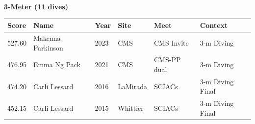 \noindent\begin{minipage}[t]{0.98\textwidth}
\centering
\textbf{\textcolor{teamprimary}{3-Meter (11 dives)}}\par
\vspace{0.5em}
\centering
\small
\renewcommand{\arraystretch}{1.0}
\setlength{\tabcolsep}{4pt}
\begin{tabular}{@{}p{2.0cm}p{3.2cm}p{1.2cm}p{2.0cm}p{2.0cm}p{2.5cm}@{}}
\toprule
\textbf{Score} & \textbf{Name} & \textbf{Year} & \textbf{Site} & \textbf{Meet} & \textbf{Context} \\
\midrule
527.60 & Makenna Parkinson & 2023 & CMS & CMS Invite & 3-m Diving \\
476.95 & Emma Ng Pack & 2021 & CMS & CMS-PP dual & 3-m Diving \\
474.20 & Carli Lessard & 2016 & LaMirada & SCIACs & 3-m Diving Final \\
452.15 & Carli Lessard & 2015 & Whittier & SCIACs & 3-m Diving Final \\
\bottomrule
\end{tabular}
\end{minipage}
\vspace{1.2em}
